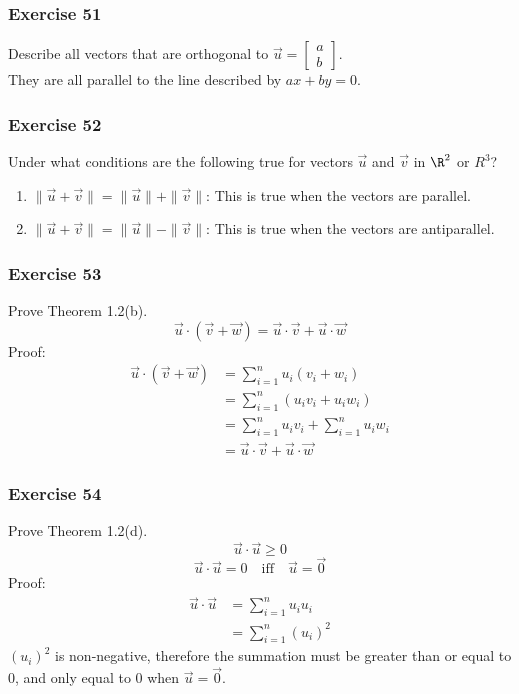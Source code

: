\documentclass[letterpaper, 12pt]{math}
\begin{document}
\subsubsection*{Exercise 51}
Describe all vectors that are orthogonal to \( \vec{u} = \begin{bmatrix}a \\ b
\end{bmatrix} \). \\
They are all parallel to the line described by \( ax+by = 0 \).

\subsubsection*{Exercise 52}
Under what conditions are the following true for vectors \( \vec{u} \) and
\( \vec{v} \) in \( \R^2 \) or \( R^3 \)?
\begin{enumerate}
  \item \( \|\vec{u}+\vec{v}\| = \|\vec{u}\|+\|\vec{v}\| \):
    This is true when the vectors are parallel.
  \item \( \|\vec{u}+\vec{v}\| = \|\vec{u}\|-\|\vec{v}\| \):
    This is true when the vectors are antiparallel.
\end{enumerate}

\subsubsection*{Exercise 53}
Prove Theorem 1.2(b).
\[ \vec{u}\cdot(\vec{v}+\vec{w}) = \vec{u}\cdot\vec{v}+\vec{u}\cdot\vec{w} \]
Proof:
\begin{align*}
  \vec{u}\cdot(\vec{v}+\vec{w}) &= \sum_{i=1}^{n}u_{i}(v_{i}+w_{i}) \\
  &= \sum_{i=1}^{n}(u_{i}v_{i}+u_{i}w_{i}) \\
  &= \sum_{i=1}^{n}u_{i}v_{i}+\sum_{i=1}^{n}u_{i}w_{i} \\
  &= \vec{u}\cdot\vec{v}+\vec{u}\cdot\vec{w}
\end{align*}

\subsubsection*{Exercise 54}
Prove Theorem 1.2(d).
\[ \vec{u}\cdot\vec{u} \ge 0 \]
\[ \vec{u}\cdot\vec{u} = 0 \quad\text{iff}\quad \vec{u} = \vec{0} \]
Proof:
\begin{align*}
  \vec{u}\cdot\vec{u} &= \sum_{i=1}^{n}u_iu_i \\
  &= \sum_{i=1}^{n}(u_i)^{2}
\end{align*}
\( (u_i)^{2} \) is non-negative, therefore the summation must be greater than
or equal to 0, and only equal to 0 when \( \vec{u} = \vec{0} \).
\end{document}
